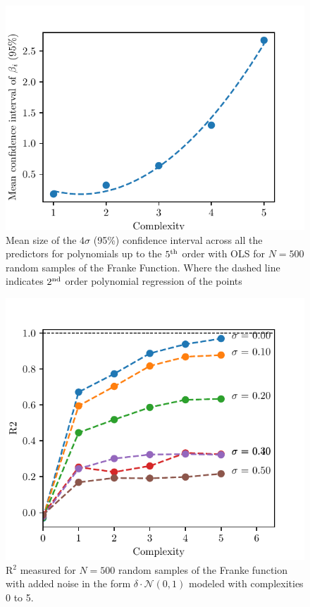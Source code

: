 \documentclass[reprint, english, nofootinbib]{revtex4-2}
\begin{document}
\begin{figure}
    \centering
    \includegraphics[width=\columnwidth]{Franke_mean_confidence_interval.pdf}
    \caption{Mean size of the $4\sigma$ (95\%) confidence interval across all the predictors for polynomials up to the $5^{\textup{th}}$ order with OLS for $N=500$ random samples of the Franke Function. Where the dashed line indicates $2^\textup{nd}$ order polynomial regression of the points}
    \label{fig:mean confidence interval}
\end{figure}


\begin{figure}[h!tb]
    \center
    \includegraphics[width=\columnwidth]{OLS_R2_noise.pdf}
    \caption{R$^2$ measured for $N=500$ random samples of the Franke function with added noise in the form $\delta\cdot\mathcal N(0, 1)$ modeled with complexities 0 to 5.}
    \label{fig:r2_vs_noise}
\end{figure}
\end{document}
